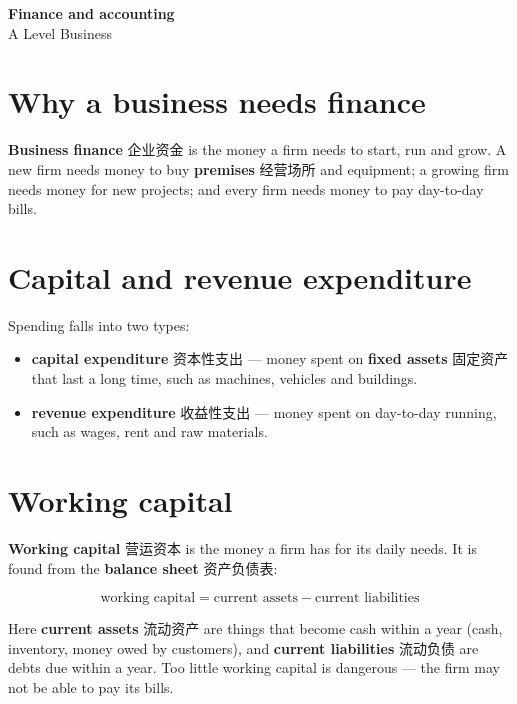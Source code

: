 \documentclass[11pt]{article}
\begin{document}
\begin{center}
  {\LARGE\bfseries Finance and accounting}\\[0.35em]
  {\large A Level Business}
\end{center}
\vspace{0.6em}

\section*{Why a business needs finance}

\textbf{Business finance} 企业资金 is the money a firm needs to start, run and grow. A new firm needs money to buy \textbf{premises} 经营场所 and equipment; a growing firm needs money for new projects; and every firm needs money to pay day-to-day bills.

\section*{Capital and revenue expenditure}

Spending falls into two types:

\begin{itemize}
\item \textbf{capital expenditure} 资本性支出 — money spent on \textbf{fixed assets} 固定资产 that last a long time, such as machines, vehicles and buildings.

\item \textbf{revenue expenditure} 收益性支出 — money spent on day-to-day running, such as wages, rent and raw materials.

\end{itemize}

\section*{Working capital}

\textbf{Working capital} 营运资本 is the money a firm has for its daily needs. It is found from the \textbf{balance sheet} 资产负债表:

\[
\text{working capital} = \text{current assets} - \text{current liabilities}
\]

Here \textbf{current assets} 流动资产 are things that become cash within a year (cash, inventory, money owed by customers), and \textbf{current liabilities} 流动负债 are debts due within a year. Too little working capital is dangerous — the firm may not be able to pay its bills.
\end{document}
